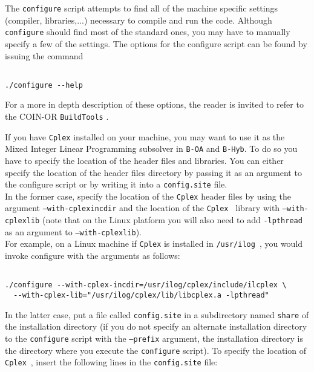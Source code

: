 The {\tt configure} script attempts to find all of the machine specific settings (compiler, libraries,...)
necessary to compile and run the code. Although {\tt configure} should find most of the standard
ones, you may have to manually specify a few of the settings.
The options for the configure script can be found by issuing the command

\begin{colorverb}
\begin{verbatim}

./configure --help

\end{verbatim}
\end{colorverb}

For a more in depth description of these options,
the reader is invited to refer to the COIN-OR {\tt BuildTools} .

If you have {\tt Cplex} installed on your machine, you may want to use it
as the Mixed Integer Linear Programming subsolver in {\tt B-OA} and {\tt B-Hyb}.
To do so you have to specify the location of the header files and libraries.
You can either specify the location of the header files directory by passing it as an
argument to the configure script or by writing it into a {\tt config.site} file.\\

In the former case, specify the location of the {\tt Cplex} header files by using the
argument {\tt --with-cplexincdir} and the location of the
{\tt Cplex } library with {\tt --with-cplexlib} (note that on the Linux platform you will also
need to add {\tt -lpthread} as an argument to {\tt --with-cplexlib}).\\

For example, on a Linux machine if {\tt Cplex} is installed in {\tt /usr/ilog}~, you would
invoke configure with the arguments as follows:

\begin{colorverb}
\begin{verbatim}

./configure --with-cplex-incdir=/usr/ilog/cplex/include/ilcplex \
  --with-cplex-lib="/usr/ilog/cplex/lib/libcplex.a -lpthread"
 \end{verbatim}
 \end{colorverb}
 
In the latter case, put a file called {\tt config.site} in a subdirectory named
{\tt share} of the installation directory (if you do not specify an alternate
installation directory to the {\tt configure} script with the {\tt --prefix}
argument, the installation directory is the directory where you execute the
{\tt configure} script). To specify the location of {\tt Cplex}~, insert the
following lines in the {\tt config.site} file:

